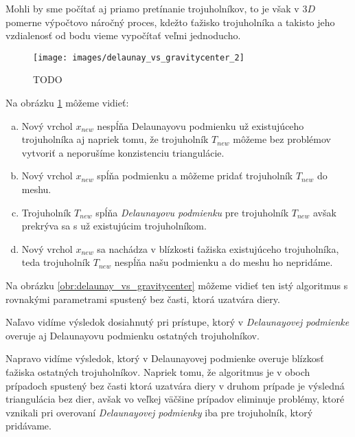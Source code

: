 \begin{enumerate}
{\begin{itemize}
{                Mohli by sme počítať aj priamo pretínanie trojuholníkov, to je však v $3D$ pomerne 
                výpočtovo náročný proces, kdežto ťažisko trojuholníka a takisto jeho vzdialenosť od 
                bodu vieme vypočítať veľmi jednoducho.
            }
         \end{itemize}
         
         \begin{figure}
         \centerline{\texttt{[image: images/delaunay\_vs\_gravitycenter\_2]}}
         \caption[]{TODO}
         \label{obr:delaunay_vs_gravitycenter_2}
         \end{figure}
         
         Na obrázku \ref{obr:delaunay_vs_gravitycenter_2} môžeme vidieť:
         \begin{enumerate}[a)]
            \item{
                Nový vrchol $x_{new}$ nespĺňa Delaunayovu podmienku už existujúceho trojuholníka aj 
                napriek tomu, že trojuholník $T_{new}$ môžeme bez problémov vytvoriť a 
                neporušíme konzistenciu triangulácie.
            }
            \item{
                Nový vrchol $x_{new}$ spĺňa podmienku a môžeme pridať trojuholník $T_{new}$ do meshu.
            }
            \item{
                Trojuholník $T_{new}$ spĺňa \textit{Delaunayovu podmienku} pre trojuholník $T_{new}$ 
                avšak prekrýva sa s už existujúcim trojuholníkom.
            }
            \item{
                Nový vrchol $x_{new}$ sa nachádza v blízkosti ťažiska existujúceho trojuholníka, 
                teda trojuholník $T_{new}$ nespĺňa našu podmienku a do meshu ho nepridáme. 
            }
         \end{enumerate}


         Na obrázku \ref{obr:delaunay_vs_gravitycenter} môžeme vidieť ten 
         istý algoritmus s rovnakými parametrami spustený bez časti, ktorá uzatvára diery. 
         
         Naľavo vidíme výsledok dosiahnutý pri prístupe, ktorý v \textit{Delaunayovej podmienke} overuje aj
         Delaunayovu podmienku ostatných trojuholníkov. 
         
         Napravo vidíme výsledok, ktorý v Delaunayovej
         podmienke overuje blízkosť ťažiska ostatných trojuholníkov. Napriek tomu, že algoritmus
         je v oboch prípadoch spustený bez časti ktorá uzatvára diery v druhom prípade je výsledná 
         triangulácia bez dier, avšak vo veľkej väčšine prípadov eliminuje problémy, ktoré vznikali 
         pri overovaní \textit{Delaunayovej podmienky} iba pre trojuholník, ktorý pridávame.
     }


\end{enumerate}
